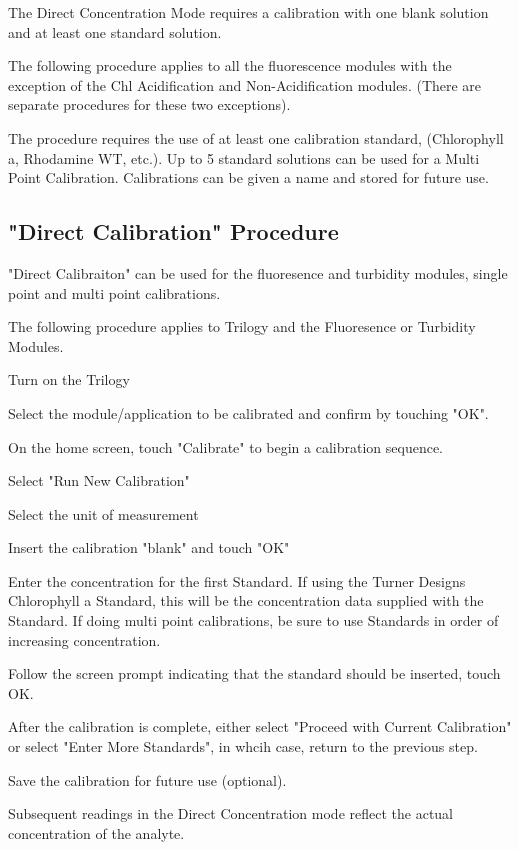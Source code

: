 \documentclass[12pt]{../SOP4_alpha}\usepackage[]{graphicx}\usepackage[]{color}
\begin{document}
\NP The Direct Concentration Mode requires a calibration with one blank solution and at least one standard solution. 

\NP The following procedure applies to all the fluorescence modules with the exception of the Chl Acidification and Non-Acidification modules. (There are separate procedures for these two exceptions). 

\NP The procedure requires the use of at least one calibration standard, (Chlorophyll a, Rhodamine WT, etc.). Up to 5 standard solutions can be used for a Multi Point Calibration. Calibrations can be given a name and stored for future use. 

\subsection{"Direct Calibration" Procedure}

\NP "Direct Calibraiton" can be used for the fluoresence and turbidity modules, single point and multi point calibrations.

\NP The following procedure applies to Trilogy and the Fluoresence or Turbidity Modules.

\NP Turn on the Trilogy

\NP Select the module/application to be calibrated and confirm by touching "OK".

\NP On the home screen, touch "Calibrate" to begin a calibration sequence.

\NP Select "Run New Calibration"

\NP Select the unit of measurement 

\NP Insert the calibration "blank" and touch "OK"

\NP Enter the concentration for the first Standard. If using the Turner Designs Chlorophyll a Standard, this will be the concentration data supplied with the Standard. If doing multi point calibrations, be sure to use Standards in order of increasing concentration.

\NP Follow the screen prompt indicating that the standard should be inserted, touch OK.

\NP After the calibration is complete, either select "Proceed with Current Calibration" or select "Enter More Standards", in whcih case, return to the previous step.

\NP Save the calibration for future use (optional).

\NP Subsequent readings in the Direct Concentration mode reflect the actual concentration of the analyte. 
\end{document}
